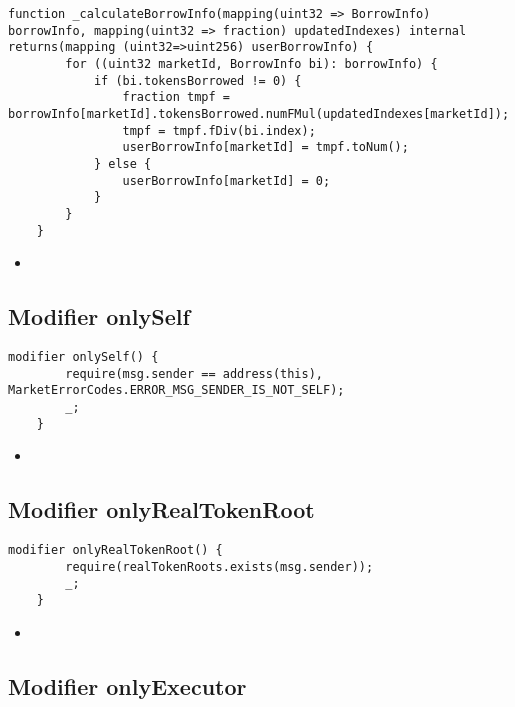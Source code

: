\begin{lstlisting}[firstnumber=516]
    function _calculateBorrowInfo(mapping(uint32 => BorrowInfo) borrowInfo, mapping(uint32 => fraction) updatedIndexes) internal returns(mapping (uint32=>uint256) userBorrowInfo) {
        for ((uint32 marketId, BorrowInfo bi): borrowInfo) {
            if (bi.tokensBorrowed != 0) {
                fraction tmpf = borrowInfo[marketId].tokensBorrowed.numFMul(updatedIndexes[marketId]);
                tmpf = tmpf.fDiv(bi.index);
                userBorrowInfo[marketId] = tmpf.toNum();
            } else {
                userBorrowInfo[marketId] = 0;
            }
        }
    }
\end{lstlisting}

\noindent\begin{itemize}
  \item {}
\end{itemize}


\subsection{Modifier onlySelf}

\begin{lstlisting}[firstnumber=510]
    modifier onlySelf() {
        require(msg.sender == address(this), MarketErrorCodes.ERROR_MSG_SENDER_IS_NOT_SELF);
        _;
    }
\end{lstlisting}

\noindent\begin{itemize}
  \item {}
\end{itemize}


\subsection{Modifier onlyRealTokenRoot}

\begin{lstlisting}[firstnumber=533]
    modifier onlyRealTokenRoot() {
        require(realTokenRoots.exists(msg.sender));
        _;
    }
\end{lstlisting}

\noindent\begin{itemize}
  \item {}
\end{itemize}


\subsection{Modifier onlyExecutor}

